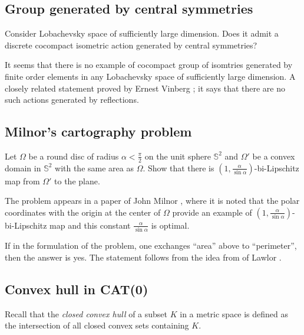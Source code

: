 \subsection*{Group generated by central symmetries}
\label{Group generated by central symmetries}

\begin{pr}
Consider Lobachevsky space of sufficiently large dimension.
Does it admit a discrete cocompact isometric action generated by central symmetries?
\end{pr}

It seems that there is no example of cocompact group of isomtries generated by finite order elements in any Lobachevsky space of sufficiently large dimension.
A closely related statement proved by Ernest Vinberg \cite[see][]{vinberg, vinberg-strong};
it says that there are no such actions generated by reflections.

\subsection*{Milnor's cartography problem}
\label{Milnor's cartography problem}

\begin{pr}
Let $\Omega$ be a round disc of radius $\alpha<\tfrac\pi2$ on the unit sphere $\mathbb{S}^2$
and $\Omega'$ be a convex domain in $\mathbb{S}^2$ with the same area as $\Omega$. Show that there is $(1,\tfrac{\alpha}{\sin\alpha})$-bi-Lipschitz map from $\Omega'$ to the plane.
\end{pr}

The problem appears in a paper of John Milnor \cite[see][]{milnor-cartography},
where it is noted that the polar coordinates with the origin at the center of $\Omega$ provide an example of $(1,\tfrac{\alpha}{\sin\alpha})$-bi-Lipschitz map and this constant $\tfrac{\alpha}{\sin\alpha}$ is optimal.

If in the formulation of the problem, one exchanges ``area''  above to ``perimeter'',
then the answer is yes. The statement follows from the idea from of Lawlor \cite[see][]{lawlor}.

\subsection*{Convex hull in CAT(0)}
\label{Convex hull in CAT(0)}

Recall that the \emph{closed convex hull} of a subset $K$ in a metric space is defined as the intersection of all closed convex sets containing $K$.


